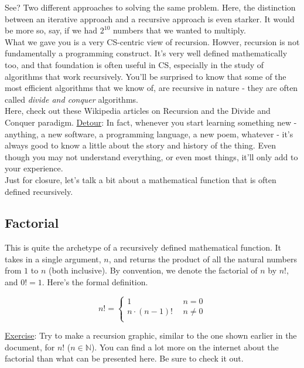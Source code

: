 \documentclass{article}
\begin{document}
\noindent See? Two different approaches to solving the same problem. Here, the distinction between an iterative approach and a recursive approach is even starker. It would be more so, say, if we had $2^10$ numbers that we wanted to multiply. \\

\noindent What we gave you is a very CS-centric view of recursion. Howver, recursion is not fundamentally a programming construct. It's very well defined mathematically too, and that foundation is often useful in CS, especially in the study of algorithms that work recursively. You'll be surprised to know that some of the most efficient algorithms that we know of, are recursive in nature - they are often called \textit{divide and conquer} algorithms. \\

\noindent Here, check out these Wikipedia articles on Recursion\cite{Recursion in CS} and the Divide and Conquer paradigm\cite{Divide and Conquer}. \underline{Detour}: In fact, whenever you start learning something new - anything, a new software, a programming language, a new poem, whatever - it's always good to know a little about the story and history of the thing. Even though you may not understand everything, or even most things, it'll only add to your experience. \\

\noindent Just for closure, let's talk a bit about a mathematical function that is often defined recursively. 

\subsection{Factorial} 

\noindent This is quite the archetype of a recursively defined mathematical function. It takes in a single argument, $n$, and returns the product of all the natural numbers from $1$ to $n$ (both inclusive). By convention, we denote the factorial of $n$ by $n!$, and $0! = 1$. Here's the formal definition. 

\begin{displaymath}
    n! = \left\{
    \begin{array}{lr}
        1 & \ \ n = 0\\
        n\cdot (n-1)! & \ \ n \neq 0\\
    \end{array}
    \right.
\end{displaymath} 

\noindent \underline{Exercise}: Try to make a recursion graphic, similar to the one shown earlier in the document, for $n!$ ($n \in \mathbb{N}$). You can find a lot more on the internet about the factorial than what can be presented here. Be sure to check it out. \\
\end{document}
